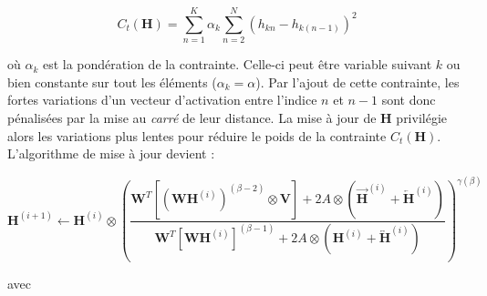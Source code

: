 \begin{equation}\label{eq:smoothnessVirtanen}
C_t(\mathbf{H}) = \sum_{n=1}^K \alpha_k\sum_{n=2}^N \left(h_{kn} - h_{k(n-1)}\right)^2
\end{equation}

où $\alpha_k$ est la pondération de la contrainte. Celle-ci peut être variable suivant $k$ ou bien constante sur tout les éléments ($\alpha_k = \alpha$). Par l'ajout de cette contrainte, les fortes variations d'un vecteur d'activation entre l'indice $n$ et $n-1$ sont donc pénalisées par la mise au \textit{carré} de leur distance. La mise à jour de $\mathbf{H}$ privilégie alors les variations plus lentes pour réduire le poids de la contrainte $C_t(\mathbf{H})$. L'algorithme de mise à jour devient :

\begin{equation}
\textbf{H}^{(i+1)} \leftarrow \textbf{H}^{(i)} \otimes\left(\frac{\textbf{W}^T \left[\left(\textbf{WH}^{(i)} \right)^{(\beta-2)} \otimes \textbf{V} \right] + 2 A \otimes \left(\overrightarrow{\mathbf{H}}^{(i)} + \overleftarrow{\mathbf{H}}^{(i)} \right)}{\textbf{W}^T \left[\textbf{WH}^{(i)} \right]^{(\beta-1)} + 2 A \otimes \left(\mathbf{H}^{(i)} + \overleftrightarrow{\mathbf{H}}^{(i)} \right)}\right)^{\gamma(\beta)}\label{eq:HupdateSmooth}
\end{equation}

avec

